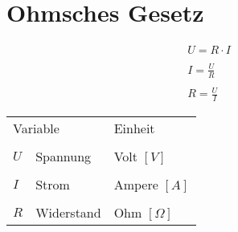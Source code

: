 



\section{Ohmsches Gesetz}
\noindent
\[ \begin{matrix}
U = R \cdot I\\\\
I = \frac{U}{R}\\\\
R = \frac{U}{I}
\end{matrix}\]
\begin{tabular}{lll}
\multicolumn{2}{l}{Variable}&Einheit\\\\
$U$&Spannung&Volt $[V]$\\\\
$I$&Strom&Ampere $[A]$\\\\
$R$&Widerstand&Ohm $[\Omega]$
\end{tabular}